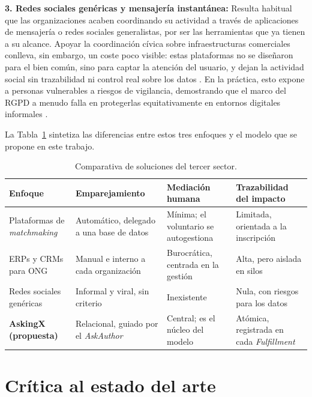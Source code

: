 \documentclass[11pt,oneside,spanish,listoffigures,listoftables]{tfgetsinf}
\begin{document}
\textbf{3. Redes sociales genéricas y mensajería instantánea:}
Resulta habitual que las organizaciones acaben coordinando su actividad a través de aplicaciones de mensajería o redes sociales generalistas, por ser las herramientas que ya tienen a su alcance. Apoyar la coordinación cívica sobre infraestructuras comerciales conlleva, sin embargo, un coste poco visible: estas plataformas no se diseñaron para el bien común, sino para captar la atención del usuario, y dejan la actividad social sin trazabilidad ni control real sobre los datos \cite{civic_engagement_platforms}. En la práctica, esto expone a personas vulnerables a riesgos de vigilancia, demostrando que el marco del RGPD a menudo falla en protegerlas equitativamente en entornos digitales informales \cite{vanzoonen2022data}.

La Tabla~\ref{tab:comparativa-plataformas} sintetiza las diferencias entre estos tres enfoques y el modelo que se propone en este trabajo.

\begin{table}[ht]
\centering
\caption[Comparativa de soluciones del tercer sector]{Comparativa de soluciones del tercer sector.}
\label{tab:comparativa-plataformas}
\footnotesize
\renewcommand{\arraystretch}{1.4}
\begin{tabularx}{\textwidth}{%
  >{\raggedright\arraybackslash}p{3cm}%
  >{\raggedright\arraybackslash}X%
  >{\raggedright\arraybackslash}X%
  >{\raggedright\arraybackslash}X}
\toprule
\textbf{Enfoque} & \textbf{Emparejamiento} & \textbf{Mediación humana} & \textbf{Trazabilidad del impacto} \\
\midrule
Plataformas de \mbox{\textit{matchmaking}} & Automático, delegado a una base de datos & Mínima; el voluntario se autogestiona & Limitada, orientada a la inscripción \\
ERPs y CRMs para ONG & Manual e interno a cada organización & Burocrática, centrada en la gestión & Alta, pero aislada en silos \\
Redes sociales genéricas & Informal y viral, sin criterio & Inexistente & Nula, con riesgos para los datos \\
\textbf{AskingX (propuesta)} & Relacional, guiado por el \mbox{\textit{AskAuthor}} & Central; es el núcleo del modelo & Atómica, registrada en cada \mbox{\textit{Fulfillment}} \\
\bottomrule
\end{tabularx}
\end{table}

\section{Crítica al estado del arte}
\end{document}
